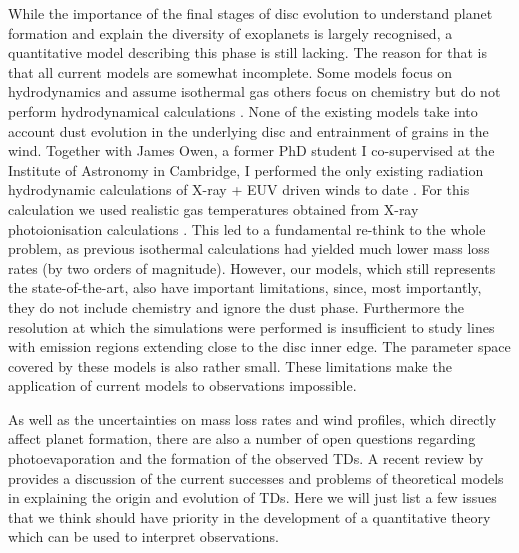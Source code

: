 \documentclass[10pt,fleqn,twoside]{article}
\begin{document}
While the importance of the final stages
of disc evolution to understand planet formation and explain the
diversity of exoplanets is largely recognised, a quantitative model describing this phase is
still lacking. The reason for that is that all current models are
somewhat 
incomplete. Some models focus on hydrodynamics and 
assume isothermal gas 
\citep[e.g.\ the EUV-only model of][]{2004ApJ...607..890F}
others focus on
chemistry but do not perform hydrodynamical calculations 
\citep[e.g.\ the FUV model of][]{2009ApJ...705.1237G}.
None of the existing models take into
account dust evolution in the underlying disc and entrainment of
grains in the wind. Together with James Owen, a former PhD student I co-supervised
at the Institute of Astronomy in Cambridge, I performed
the only existing radiation hydrodynamic calculations of X-ray  + EUV driven
winds to date 
\citep{2010MNRAS.401.1415O, 2011MNRAS.412...13O,
  2012MNRAS.422.1880O}. For this calculation
we used realistic gas
temperatures obtained from X-ray photoionisation calculations
\citep{2008ApJ...688..398E, 2009ApJ...699.1639E}.
This led to a fundamental re-think to the
whole problem, as previous isothermal calculations had yielded much
lower mass loss rates (by two orders of magnitude). However, our
models, which still represents the state-of-the-art, also have
important limitations, since, most importantly, they do not include
chemistry and ignore the dust phase. Furthermore the resolution at
which the simulations were performed is insufficient to study lines with
emission regions extending close to the disc inner edge. The parameter
space covered by these models is also rather small. These
limitations make the application of current models to observations
impossible.  

As well as the uncertainties on mass loss rates and wind profiles,
which directly affect planet formation, there are also a number of
open questions regarding photoevaporation and the formation of the
observed TDs. A recent review by 
\citet{2016PASA...33....5O}
provides a discussion of
the current successes and problems of theoretical models in
explaining the origin and evolution of TDs. Here we will just list a
few issues that we think should have priority in the development of a
quantitative theory which can be used to interpret observations. 
\end{document}
